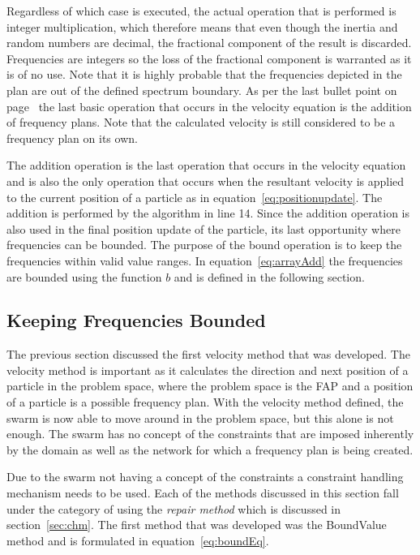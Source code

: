 Regardless of which case is executed, the actual operation that is performed is integer multiplication, which therefore means that even though the inertia and random numbers are decimal, the fractional component of the result is discarded. Frequencies are integers so the loss of the fractional component is warranted as it is of no use. Note that it is highly probable that the frequencies depicted in the plan are out of the defined spectrum boundary. As per the last bullet point on page~\pageref{lst:velocitybreakup} the last basic operation that occurs in the velocity equation is the addition of frequency plans. Note that the calculated velocity is still considered to be a frequency plan on its own.

The addition operation is the last operation that occurs in the velocity equation and is also the only operation that occurs when the resultant velocity is applied to the current position of a particle as in equation~\ref{eq:positionupdate}. The addition is performed by the algorithm in line 14. Since the addition operation is also used in the final position update of the particle, its last opportunity where frequencies can be bounded.  The purpose of the bound operation is to keep the frequencies within valid value ranges. In equation~\ref{eq:arrayAdd} the frequencies are bounded using the function $b$ and is defined in the following section.
\subsection{Keeping Frequencies Bounded}
The previous section discussed the first velocity method that was developed. The velocity method is important as it calculates the direction and next position of a particle in the problem space, where the problem space is the \gls{FAP} and a position of a particle is a possible frequency plan. With the velocity method defined, the swarm is now able to move around in the problem space, but this alone is not enough. The swarm has no concept of the constraints that are imposed inherently by the domain as well as the network for which a frequency plan is being created.

Due to the swarm not having a concept of the constraints a constraint handling mechanism needs to be used. Each of the methods discussed in this section fall under the category of using the \emph{repair method} which is discussed in section~\ref{sec:chm}. The first method that was developed was the BoundValue method and is formulated in equation~\ref{eq:boundEq}.

